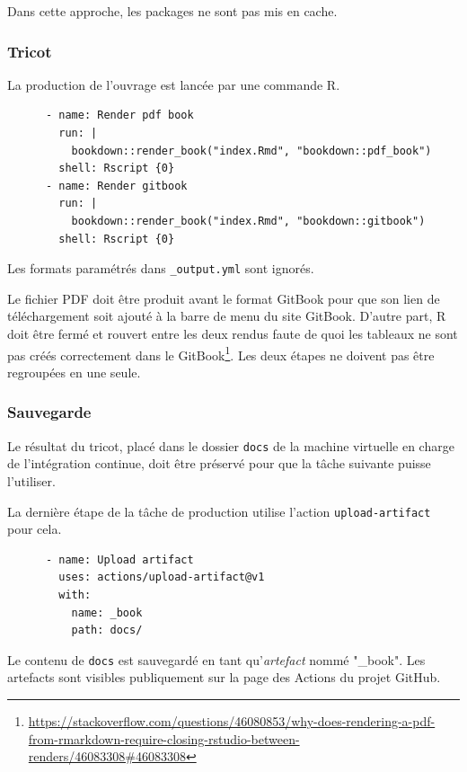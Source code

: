 \documentclass[
  12pt,
  french,
  a4paper,
  extrafontsizes,onecolumn,openright
  ]{memoir}
\newlength{\rf}
\begin{document}
Dans cette approche, les packages ne sont pas mis en cache.

\hypertarget{tricot}{%
\subsubsection{Tricot}\label{tricot}}

La production de l'ouvrage est lancée par une commande R.

\begin{verbatim}
      - name: Render pdf book
        run: |
          bookdown::render_book("index.Rmd", "bookdown::pdf_book")
        shell: Rscript {0}
      - name: Render gitbook
        run: |
          bookdown::render_book("index.Rmd", "bookdown::gitbook")
        shell: Rscript {0}
\end{verbatim}

Les formats paramétrés dans \texttt{\_output.yml} sont ignorés.

Le fichier PDF doit être produit avant le format GitBook pour que son lien de téléchargement soit ajouté à la barre de menu du site GitBook.
D'autre part, R doit être fermé et rouvert entre les deux rendus faute de quoi les tableaux ne sont pas créés correctement dans le GitBook\footnote{\url{https://stackoverflow.com/questions/46080853/why-does-rendering-a-pdf-from-rmarkdown-require-closing-rstudio-between-renders/46083308\#46083308}}.
Les deux étapes ne doivent pas être regroupées en une seule.

\hypertarget{sauvegarde}{%
\subsubsection{Sauvegarde}\label{sauvegarde}}

Le résultat du tricot, placé dans le dossier \texttt{docs} de la machine virtuelle en charge de l'intégration continue, doit être préservé pour que la tâche suivante puisse l'utiliser.

La dernière étape de la tâche de production utilise l'action \texttt{upload-artifact} pour cela.

\begin{verbatim}
      - name: Upload artifact
        uses: actions/upload-artifact@v1
        with:
          name: _book
          path: docs/
\end{verbatim}

Le contenu de \texttt{docs} est sauvegardé en tant qu'\emph{artefact} nommé "\_book".
Les artefacts sont visibles publiquement sur la page des Actions du projet GitHub.
\end{document}
